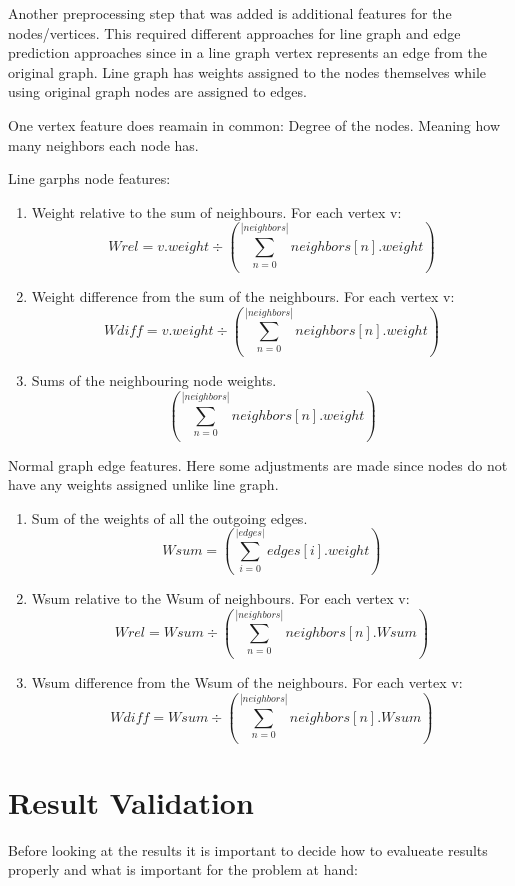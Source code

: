 Another preprocessing step that was added is additional features for the nodes/vertices. This required different approaches for line graph and edge prediction approaches since in a line graph vertex represents an edge from the original graph. Line graph has weights assigned to the nodes themselves while using original graph nodes are assigned to edges.

One vertex feature does reamain in common: Degree of the nodes. Meaning how many neighbors each node has.

Line garphs node features:  

\begin{enumerate}
\item Weight relative to the sum of neighbours. For each vertex v:  \[ Wrel = v.weight  \div  (\sum_{n=0}^{|neighbors|} neighbors[n].weight) \]
\item Weight difference from the sum of the neighbours. For each vertex v:  \[ Wdiff = v.weight  \div  (\sum_{n=0}^{|neighbors|} neighbors[n].weight) \]
\item Sums of the neighbouring node weights. \[ (\sum_{n=0}^{|neighbors|} neighbors[n].weight) \]
\end{enumerate}

Normal graph edge features. Here some adjustments are made since nodes do not have any weights assigned unlike line graph.

\begin{enumerate}
\item Sum of the weights of all the outgoing edges.  \[ Wsum = (\sum_{i=0}^{|edges|} edges[i].weight) \]
\item Wsum relative to the Wsum of neighbours. For each vertex v:  \[ Wrel = Wsum \div (\sum_{n=0}^{|neighbors|} neighbors[n].Wsum) \]
\item Wsum difference from the Wsum of the neighbours. For each vertex v: \[ Wdiff = Wsum \div (\sum_{n=0}^{|neighbors|} neighbors[n].Wsum) \]
\end{enumerate}

\section{Result Validation}

Before looking at the results it is important to decide how to evalueate results properly and what is important for the problem at hand:

